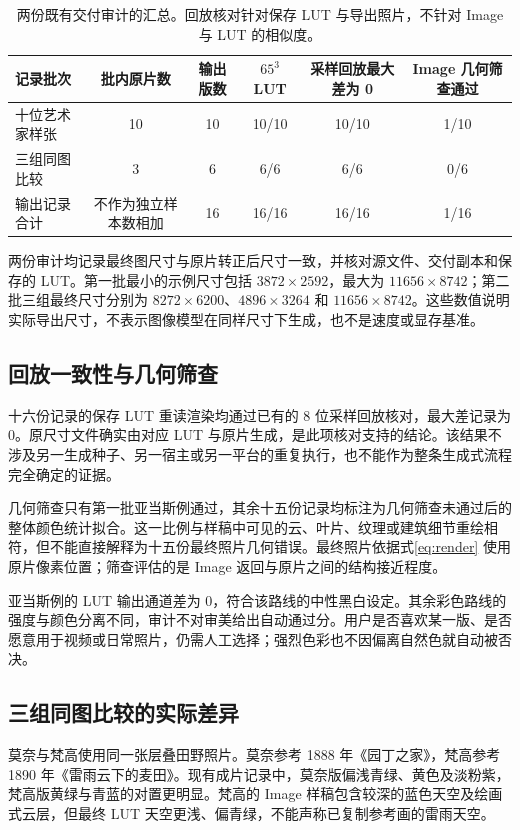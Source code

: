 \begin{table}[t]
\caption{两份既有交付审计的汇总。回放核对针对保存 LUT 与导出照片，不针对 Image 与 LUT 的相似度。}
\label{tab:audit}
\centering\small
\begin{tabular}{lccccc}
\hline
记录批次 & 批内原片数 & 输出版数 & $65^3$ LUT & 采样回放最大差为 0 & Image 几何筛查通过\\\hline
十位艺术家样张 & 10 & 10 & 10/10 & 10/10 & 1/10\\
三组同图比较 & 3 & 6 & 6/6 & 6/6 & 0/6\\
输出记录合计 & 不作为独立样本数相加 & 16 & 16/16 & 16/16 & 1/16\\\hline
\end{tabular}
\end{table}

两份审计均记录最终图尺寸与原片转正后尺寸一致，并核对源文件、交付副本和保存的 LUT。第一批最小的示例尺寸包括 $3872\times2592$，最大为 $11656\times8742$；第二批三组最终尺寸分别为 $8272\times6200$、$4896\times3264$ 和 $11656\times8742$。这些数值说明实际导出尺寸，不表示图像模型在同样尺寸下生成，也不是速度或显存基准。

\subsection{回放一致性与几何筛查}
十六份记录的保存 LUT 重读渲染均通过已有的 8 位采样回放核对，最大差记录为 0。原尺寸文件确实由对应 LUT 与原片生成，是此项核对支持的结论。该结果不涉及另一生成种子、另一宿主或另一平台的重复执行，也不能作为整条生成式流程完全确定的证据。

几何筛查只有第一批亚当斯例通过，其余十五份记录均标注为几何筛查未通过后的整体颜色统计拟合。这一比例与样稿中可见的云、叶片、纹理或建筑细节重绘相符，但不能直接解释为十五份最终照片几何错误。最终照片依据式\eqref{eq:render} 使用原片像素位置；筛查评估的是 Image 返回与原片之间的结构接近程度。

亚当斯例的 LUT 输出通道差为 0，符合该路线的中性黑白设定。其余彩色路线的强度与颜色分离不同，审计不对审美给出自动通过分。用户是否喜欢某一版、是否愿意用于视频或日常照片，仍需人工选择；强烈色彩也不因偏离自然色就自动被否决。

\subsection{三组同图比较的实际差异}
莫奈与梵高使用同一张层叠田野照片。莫奈参考 1888 年《园丁之家》\cite{monet}，梵高参考 1890 年《雷雨云下的麦田》\cite{vangogh}。现有成片记录中，莫奈版偏浅青绿、黄色及淡粉紫，梵高版黄绿与青蓝的对置更明显。梵高的 Image 样稿包含较深的蓝色天空及绘画式云层，但最终 LUT 天空更浅、偏青绿，不能声称已复制参考画的雷雨天空。

